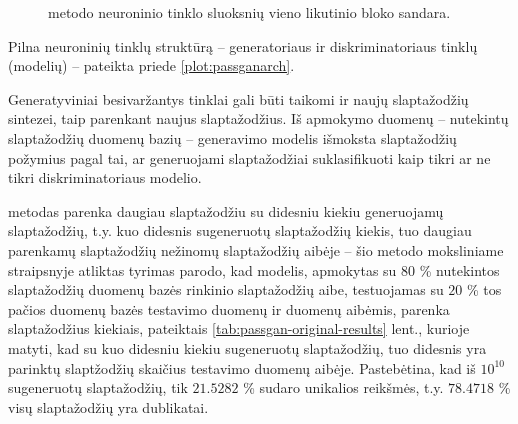 \documentclass{VUMIFInfBakalaurinis}
\begin{document}
\begin{figure}[!ht]
  \begin{center}
  \end{center}
  \caption{%
     metodo neuroninio tinklo sluoksnių vieno likutinio bloko 
    sandara.
  }
  \label{plot:passganblock}
\end{figure}

Pilna neuroninių tinklų struktūrą -- generatoriaus ir diskriminatoriaus tinklų 
(modelių) -- pateikta priede \ref{plot:passganarch}.

Generatyviniai besivaržantys tinklai gali būti taikomi ir naujų slaptažodžių 
sintezei, taip parenkant naujus slaptažodžius. Iš apmokymo duomenų -- nutekintų 
slaptažodžių duomenų bazių -- generavimo modelis išmoksta slaptažodžių požymius 
pagal tai, ar generuojami slaptažodžiai suklasifikuoti kaip tikri ar ne tikri 
diskriminatoriaus modelio.

 metodas parenka daugiau slaptažodžiu su didesniu kiekiu 
generuojamų slaptažodžių, t.y. kuo didesnis sugeneruotų slaptažodžių kiekis, tuo 
daugiau parenkamų slaptažodžių nežinomų slaptažodžių aibėje -- šio metodo 
moksliniame straipsnyje atliktas tyrimas parodo, kad modelis, apmokytas su $80$ 
\%  nutekintos slaptažodžių duomenų bazės rinkinio 
slaptažodžių aibe, testuojamas su $20$ \% tos pačios duomenų bazės testavimo 
duomenų ir  duomenų aibėmis, parenka slaptažodžius kiekiais, 
pateiktais \ref{tab:passgan-original-results} lent., kurioje matyti, kad su kuo 
didesniu kiekiu sugeneruotų slaptažodžių, tuo didesnis yra parinktų slaptžodžių 
skaičius testavimo duomenų aibėje. Pastebėtina, kad iš $10^{10}$ sugeneruotų 
slaptažodžių, tik $21.5282$ \% sudaro unikalios reikšmės, t.y. $78.4718$ \% visų 
slaptažodžių yra dublikatai.
\end{document}
